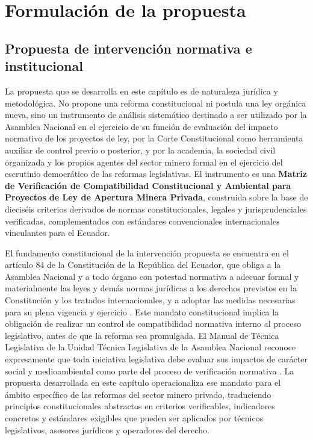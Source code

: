 \section{Formulación de la propuesta}

\subsection{Propuesta de intervención normativa e institucional}

La propuesta que se desarrolla en este capítulo es de naturaleza jurídica y metodológica. No propone una reforma constitucional ni postula una ley orgánica nueva, sino un instrumento de análisis sistemático destinado a ser utilizado por la Asamblea Nacional en el ejercicio de su función de evaluación del impacto normativo de los proyectos de ley, por la Corte Constitucional como herramienta auxiliar de control previo o posterior, y por la academia, la sociedad civil organizada y los propios agentes del sector minero formal en el ejercicio del escrutinio democrático de las reformas legislativas. El instrumento es una \textbf{Matriz de Verificación de Compatibilidad Constitucional y Ambiental para Proyectos de Ley de Apertura Minera Privada}, construida sobre la base de dieciséis criterios derivados de normas constitucionales, legales y jurisprudenciales verificadas, complementados con estándares convencionales internacionales vinculantes para el Ecuador.

El fundamento constitucional de la intervención propuesta se encuentra en el artículo 84 de la Constitución de la República del Ecuador, que obliga a la Asamblea Nacional y a todo órgano con potestad normativa a adecuar formal y materialmente las leyes y demás normas jurídicas a los derechos previstos en la Constitución y los tratados internacionales, y a adoptar las medidas necesarias para su plena vigencia y ejercicio \parencite{cre_2008}. Este mandato constitucional implica la obligación de realizar un control de compatibilidad normativa interno al proceso legislativo, antes de que la reforma sea promulgada. El Manual de Técnica Legislativa de la Unidad Técnica Legislativa de la Asamblea Nacional reconoce expresamente que toda iniciativa legislativa debe evaluar sus impactos de carácter social y medioambiental como parte del proceso de verificación normativa \parencite{manual_tecnica_legislativa_an}. La propuesta desarrollada en este capítulo operacionaliza ese mandato para el ámbito específico de las reformas del sector minero privado, traduciendo principios constitucionales abstractos en criterios verificables, indicadores concretos y estándares exigibles que pueden ser aplicados por técnicos legislativos, asesores jurídicos y operadores del derecho.

